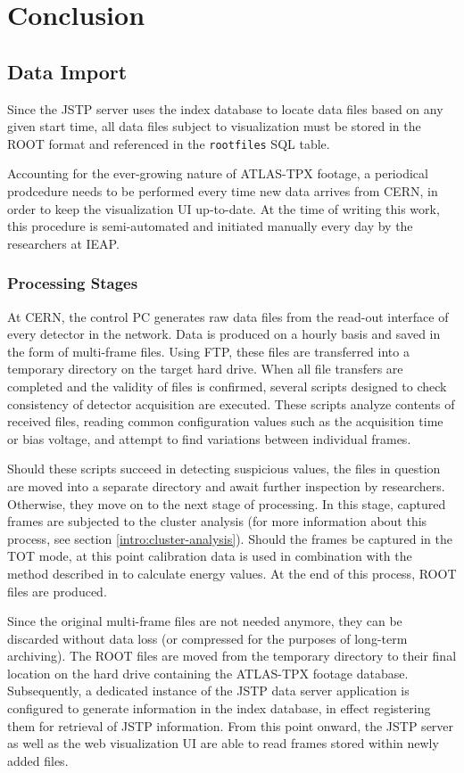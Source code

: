 \chapter{Conclusion}

\section{Data Import}
Since the JSTP server uses the index database to locate data files based on any given start time, all data files subject to visualization must be stored in the ROOT format and referenced in the \texttt{rootfiles} SQL table.

Accounting for the ever-growing nature of ATLAS-TPX footage, a periodical prodcedure needs to be performed every time new data arrives from CERN, in order to keep the visualization UI up-to-date. At the time of writing this work, this procedure is semi-automated and initiated manually every day by the researchers at IEAP.

\subsection{Processing Stages}
At CERN, the control PC generates raw data files from the read-out interface of every detector in the network. Data is produced on a hourly basis and saved in the form of multi-frame files. Using FTP, these files are transferred into a temporary directory on the target hard drive. When all file transfers are completed and the validity of files is confirmed, several scripts designed to check consistency of detector acquisition are executed. These scripts analyze contents of received files, reading common configuration values such as the acquisition time or bias voltage, and attempt to find variations between individual frames.

Should these scripts succeed in detecting suspicious values, the files in question are moved into a separate directory and await further inspection by researchers. Otherwise, they move on to the next stage of processing. In this stage, captured frames are subjected to the cluster analysis (for more information about this process, see section \ref{intro:cluster-analysis}). Should the frames be captured in the TOT mode, at this point calibration data is used in combination with the method described in \cite{Jakubek2011S262} to calculate energy values. At the end of this process, ROOT files are produced.

Since the original multi-frame files are not needed anymore, they can be discarded without data loss (or compressed for the purposes of long-term archiving). The ROOT files are moved from the temporary directory to their final location on the hard drive containing the ATLAS-TPX footage database. Subsequently, a dedicated instance of the JSTP data server application is configured to generate information in the index database, in effect registering them for retrieval of JSTP information. From this point onward, the JSTP server as well as the web visualization UI are able to read frames stored within newly added files.

